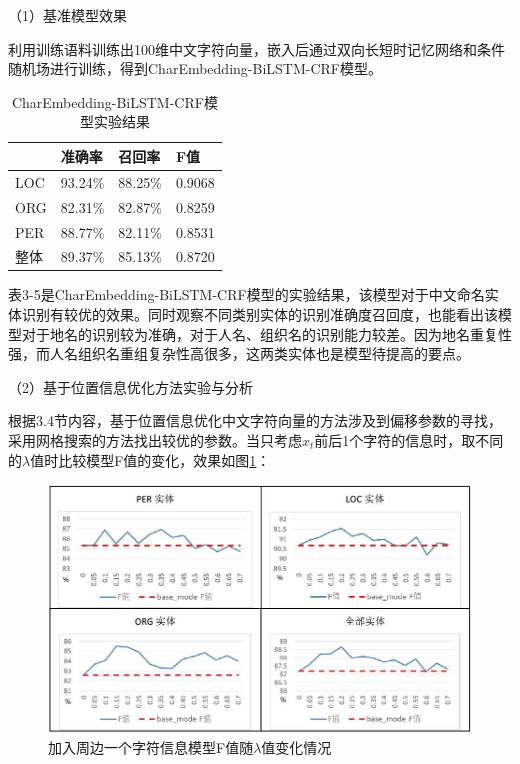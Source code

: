 \documentclass[winfonts,master,oneside,nobackinfo]{njuthesis}
\begin{document}
（1）基准模型效果

利用训练语料训练出100维中文字符向量，嵌入后通过双向长短时记忆网络和条件随机场进行训练，得到CharEmbedding-BiLSTM-CRF模型。

\begin{table}[H]
\centering
\begin{tabular}{|l|l|l|l|}
\hline
    & 准确率     & 召回率     & F值    \\ \hline
LOC & 93.24\% & 88.25\% & 0.9068 \\ \hline
ORG & 82.31\% & 82.87\% & 0.8259 \\ \hline
PER & 88.77\% & 82.11\% & 0.8531 \\ \hline
整体  & 89.37\% & 85.13\% & 0.8720 \\ \hline
\end{tabular}
\caption{CharEmbedding-BiLSTM-CRF模型实验结果}
\end{table}

表3-5是CharEmbedding-BiLSTM-CRF模型的实验结果，该模型对于中文命名实体识别有较优的效果。同时观察不同类别实体的识别准确度召回度，也能看出该模型对于地名的识别较为准确，对于人名、组织名的识别能力较差。因为地名重复性强，而人名组织名重组复杂性高很多，这两类实体也是模型待提高的要点。

（2）基于位置信息优化方法实验与分析

根据3.4节内容，基于位置信息优化中文字符向量的方法涉及到偏移参数的寻找，采用网格搜索的方法找出较优的参数。当只考虑$x_{t}$前后1个字符的信息时，取不同的$\lambda$值时比较模型F值的变化，效果如图\ref{k=1}：

\begin{figure}[H]
\centering
\includegraphics[width=1\textwidth]{./figure/参数1.jpg}
\caption{加入周边一个字符信息模型F值随$\lambda$值变化情况}
\label{k=1}
\end{figure}
\end{document}
